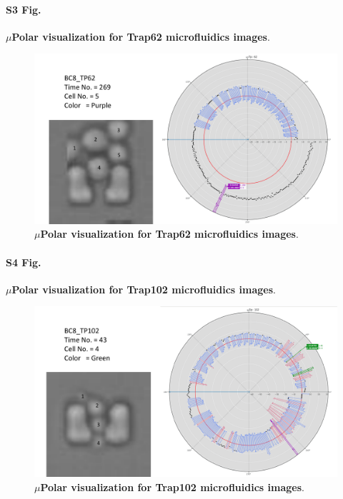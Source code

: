 \documentclass[conference]{IEEEtran}
\begin{document}
\paragraph*{S3 Fig.}
\label{S3_Fig}
{\bf $\mu$Polar visualization for Trap62 microfluidics images}. 

\begin{figure}
\centering
\includegraphics[width=\textwidth,height=10 cm]{Patterns/bc8_tp62.pdf}
\caption{ \textbf{$\mu$Polar visualization for Trap62 microfluidics images}.}
\label{fig:tp62}
\end{figure}


\paragraph*{S4 Fig.}
\label{S6_Fig}
{\bf  $\mu$Polar visualization for Trap102 microfluidics images}. 

\begin{figure}
\centering
\includegraphics[width=\textwidth,height=10 cm]{Patterns/bc8_tp102.pdf}
\caption{  \textbf{$\mu$Polar visualization for Trap102 microfluidics images}.}
\label{fig:tp102}
\end{figure}
\end{document}
